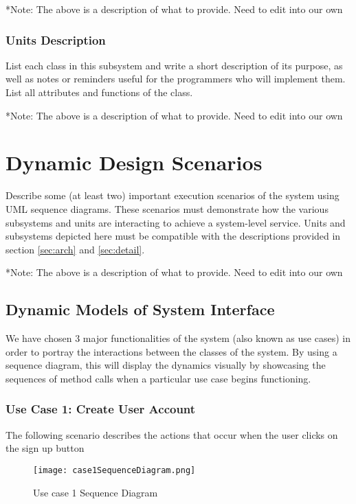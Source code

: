 \documentclass[12pt]{article}
\begin{document}
*Note: The above is a description of what to provide. Need to edit into our own




\subsubsection{Units Description}

List each class in this subsystem and write a short description of its purpose,
as well as notes or reminders useful for the programmers who will implement them.
List all attributes and functions of the class.

*Note: The above is a description of what to provide. Need to edit into our own

\section{Dynamic Design Scenarios} \label{Dynamic Models}

Describe some (at least two) important execution scenarios of the system using UML sequence diagrams.
These scenarios must demonstrate how the various subsystems and units are interacting to achieve a system-level service.
Units and subsystems depicted here must be compatible with the descriptions provided in
section \ref{sec:arch} and \ref{sec:detail}.

*Note: The above is a description of what to provide. Need to edit into our own


\subsection{Dynamic Models of System Interface}

We have chosen 3 major functionalities of the system (also known as use cases) in order to portray the interactions between the classes of the system. By using a sequence diagram, this will display the dynamics visually by showcasing the sequences of method calls when a particular use case begins functioning.

\clearpage

\subsubsection{Use Case 1: Create User Account}

The following scenario describes the actions that occur when the user clicks on the sign up button

\begin{figure}[H]
\texttt{[image: case1SequenceDiagram.png]}
\caption{Use case 1 Sequence Diagram}
\label{fig:use-case-1-sequence-diagram}
\end{figure}
\end{document}
